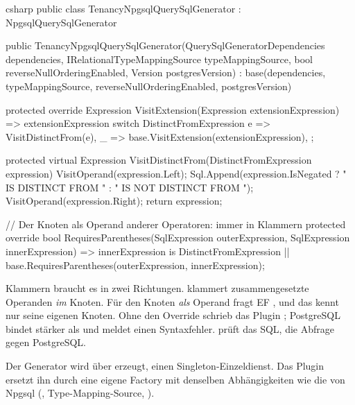 \begin{sourcecode}{csharp}
public class TenancyNpgsqlQuerySqlGenerator : NpgsqlQuerySqlGenerator
{
    public TenancyNpgsqlQuerySqlGenerator(QuerySqlGeneratorDependencies dependencies,
        IRelationalTypeMappingSource typeMappingSource,
        bool reverseNullOrderingEnabled, Version postgresVersion)
        : base(dependencies, typeMappingSource, reverseNullOrderingEnabled, postgresVersion)
    {
    }

    protected override Expression VisitExtension(Expression extensionExpression)
        => extensionExpression switch
        {
            DistinctFromExpression e => VisitDistinctFrom(e),
            _ => base.VisitExtension(extensionExpression),
        };

    protected virtual Expression VisitDistinctFrom(DistinctFromExpression expression)
    {
        VisitOperand(expression.Left);
        Sql.Append(expression.IsNegated ? " IS DISTINCT FROM " : " IS NOT DISTINCT FROM ");
        VisitOperand(expression.Right);
        return expression;
    }

    // Der Knoten als Operand anderer Operatoren: immer in Klammern
    protected override bool RequiresParentheses(SqlExpression outerExpression,
        SqlExpression innerExpression)
        => innerExpression is DistinctFromExpression
           || base.RequiresParentheses(outerExpression, innerExpression);
}
\end{sourcecode}

Klammern braucht es in zwei Richtungen.  klammert
zusammengesetzte Operanden \emph{im} Knoten. Für den Knoten \emph{als} Operand fragt EF
, und das kennt nur seine eigenen Knoten. Ohne den
Override schrieb das Plugin
; PostgreSQL bindet \code{<>} stärker
als  und meldet einen Syntaxfehler. 
prüft das SQL,  die Abfrage gegen PostgreSQL.

Der Generator wird über
 erzeugt, einen
Singleton-Einzeldienst. Das Plugin ersetzt ihn durch eine eigene Factory mit denselben
Abhängigkeiten wie die von Npgsql
(,
Type-Mapping-Source, ).

